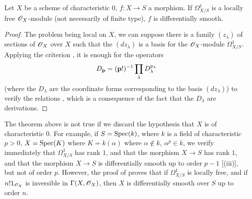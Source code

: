 \begin{theorem}[16.12.2]
\label{IV.16.12.2}
Let $X$ be a scheme of characteristic $0$, $f:X \to S$ a morphism.
If $\Omega_{X/S}^1$ is a locally free $\mathscr{O}_X$-module (not necessarily of finite type), $f$ is differentially smooth.
\end{theorem}

\begin{proof}
The problem being local on $X$, we can suppose there is a family $(z_\lambda)$ of sections of $\mathscr{O}_X$ over $X$ such that the $(dz_\lambda)$ is a basis for the $\mathscr{O}_X$-module $\Omega_{X/S}^1$.
Applying the criterion , it is enough for the operators 
\[
  D_\mathbf{p} = (\mathbf{p}!)^{-1} \prod_\lambda D_\lambda^{p_\lambda}
\]
(where the $D_\lambda$ are the coordinate forms corresponding to the basis $(dz_\lambda)$) to verify the relations , which is a consequence of the fact that the $D_\lambda$ are derivations.
\end{proof}

\begin{env}[16.12.3]
\label{IV.16.12.3}
The theorem above is not true if we discard the hypothesis that $X$ is of characteristic $0$.
For example, if $S = \operatorname{Spec}(k)$, where $k$ is a field of characteristic $p > 0$, $X = \operatorname{Spec}(K)$ where $K = k(\alpha)$ where $\alpha \notin k$, $\alpha^p \in k$, we verify immediately 
that $\Omega_{X/S}^1$ has rank $1$, and that the morphism $X \to S$ has rank $1$, and that the morphism $X \to S$ is differentially smooth up to order $p - 1$ [(iii)], but not of order $p$.
However, the proof of  proves that if $\Omega_{X/S}^1$ is locally free, and if $n! 1_{\mathscr{O}_X}$ is inversible in $\Gamma(X, \mathscr{O}_X)$, then $X$ is differentially smooth over $S$ up to order $n$.
\end{env}
